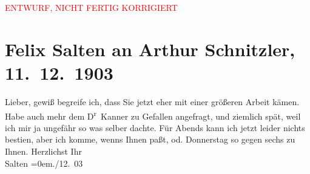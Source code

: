 
\begin{center}
            \textcolor{red}{ENTWURF, NICHT FERTIG KORRIGIERT}
                      \end{center}
            
         
         \renewcommand{\erwaehntePersonen}{Personen: Heinrich Kanner}
         \renewcommand{\erwaehnteOrte}{Orte: Wien}
         \renewcommand{\erwaehnteWerke}{}
               \section[Felix Salten an Arthur Schnitzler, 11. 12. 1903]{ Felix Salten an Arthur Schnitzler, 11. 12. 1903}\nopagebreak{}\rehead{ }\begin{ledgroupsized}[t]{13cm}\normalsize\beginnumbering \toendnotes[C]{\smallbreak\pagebreak[2]} 
\toendnotes[C]{\smallbreak}\pstart
           \noindent{}{\pb}Lieber, gewiß begreife ich, dass Sie jetzt eher mit einer größeren
               Arbeit kämen. Habe auch mehr dem D\textsuperscript{r} Kanner zu Gefallen angefragt, und ziemlich spät, weil ich mir
               ja ungefähr so was selber dachte. Für Abends kann ich jetzt leider nichts besti{\geminationm}en, aber ich komme, wenns Ihnen paßt, \label{K_L03356-4v}\label{K_L03356-4h} od. Donnerstag so gegen sechs zu Ihnen.\pend
           \pstart
           Herzlichst Ihr {\\[\baselineskip]}\spacefill\mbox{Salten}\pend
           \leftskip=0em{}./12. 03\pend
           
         
         \endnumbering{}\end{ledgroupsized}\begin{anhang}\end{anhang}\newcommand{\dateiname}{L03356}\newcommand{\titel}{Felix Salten an Arthur Schnitzler, 11. 12. 1903}\newcommand{\editorInnen}{Martin Anton Müller und Laura Untner}
      